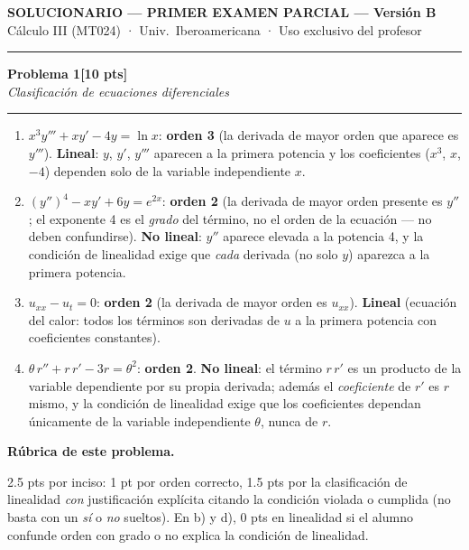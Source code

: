 \documentclass[11pt,letterpaper]{article}
\newcommand{\problema}[3]{%
  \bigskip\bigskip\noindent
  {\Large\textbf{Problema #1}}\hfill\textbf{[#2 pts]}\\[3pt]
  {\small\itshape #3}\par
  \vspace{2pt}\hrule\vspace{8pt}
}
\newenvironment{rubrica}{%
  \begin{mdframed}[linecolor=black,linewidth=0.6pt,
    innerleftmargin=8pt,innerrightmargin=8pt,innertopmargin=5pt,innerbottommargin=5pt]
  \small\textbf{Rúbrica de este problema.}\par\smallskip
}{\end{mdframed}}
\begin{document}
\begin{center}
{\Large\bfseries SOLUCIONARIO — PRIMER EXAMEN PARCIAL --- Versión B}\\[2pt]
{\small Cálculo III (MT024) · Univ.\ Iberoamericana · Uso exclusivo del profesor}
\end{center}

\vspace{4pt}\hrule

\vspace{10pt}

\problema{1}{10}{Clasificación de ecuaciones diferenciales}

\begin{enumerate}[label=\textbf{\alph*)}, itemsep=8pt]
  \item $x^3 y''' + x y' - 4y = \ln x$: \textbf{orden 3} (la derivada de mayor orden que aparece es $y'''$). \textbf{Lineal}: $y$, $y'$, $y'''$ aparecen a la primera potencia y los coeficientes ($x^3$, $x$, $-4$) dependen solo de la variable independiente $x$.
  \item $(y'')^4 - xy' + 6y = e^{2x}$: \textbf{orden 2} (la derivada de mayor orden presente es $y''$; el exponente 4 es el \emph{grado} del término, no el orden de la ecuación — no deben confundirse). \textbf{No lineal}: $y''$ aparece elevada a la potencia 4, y la condición de linealidad exige que \emph{cada} derivada (no solo $y$) aparezca a la primera potencia.
  \item $u_{xx}-u_t=0$: \textbf{orden 2} (la derivada de mayor orden es $u_{xx}$). \textbf{Lineal} (ecuación del calor: todos los términos son derivadas de $u$ a la primera potencia con coeficientes constantes).
  \item $\theta\,r'' + r\,r' - 3r = \theta^2$: \textbf{orden 2}. \textbf{No lineal}: el término $r\,r'$ es un producto de la variable dependiente por su propia derivada; además el \emph{coeficiente} de $r'$ es $r$ mismo, y la condición de linealidad exige que los coeficientes dependan únicamente de la variable independiente $\theta$, nunca de $r$.
\end{enumerate}

\begin{rubrica}
2.5 pts por inciso: 1 pt por orden correcto, 1.5 pts por la clasificación de linealidad \emph{con} justificación explícita citando la condición violada o cumplida (no basta con un \emph{sí} o \emph{no} sueltos). En b) y d), 0 pts en linealidad si el alumno confunde orden con grado o no explica la condición de linealidad.
\end{rubrica}
\end{document}
